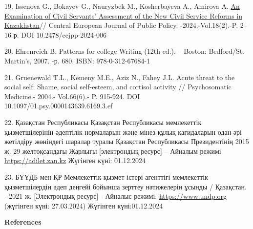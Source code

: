 \begin{references}
19. Issenova G., Bokayev G., Nauryzbek M., Kosherbayeva A., Amirova A.
\href{https://www.scopus.com/record/display.uri?eid=2-s2.0-85208677871&origin=resultslist&sort=plf-f&src=s&sot=b&sdt=b&s=TITLE\%28An+Examination+of+Civil+Servants\%E2\%80\%99+Assessment+of++the+New+Civil+Service+Reforms+in+Kazakhstan\%29&sessionSearchId=9294c12779ee47479a1a0997e8991897&relpos=0}{\hfill\break
An Examination of Civil Servants'{} Assessment of the New
Civil Service Reforms in Kazakhstan}// Central European Journal of
Public Policy. -2024.-Vol.18(2).-P. 2--16 р. DOI 10.2478/cejpp-2024-006

20. Ehrenreich B. Patterns for college Writing (12th ed.). -- Boston:
Bedford/St. Martin's, 2007. -р. 680. ISBN: 978-0-312-67684-1

21. Gruenewald T.L., Kemeny M.E., Aziz N., Fahey J.L. Acute threat to
the social self: Shame, social self-esteem, and cortisol activity //
Psychosomatic Medicine.- 2004.- Vol.66(6).- P. 915-924. DOI\\
10.1097/01.psy.0000143639.6169.3.ef

22. Қазақстан Республикасы Қазақстан Республикасы мемлекеттік
қызметшілерінің әдептілік нормаларын және мінез-құлық қағидаларын одан
әрі жетілдіру жөніндегі шаралар туралы Қазақстан Республикасы
Президентінің 2015 ж. 29 желтоқсандағы Жарлығы {[}электрондық ресурс{]}
-- Айналым режимі \href{https://adilet.zan.kz/kaz/docs/U1500000153}{https://adilet.zan.kz} Жүгінген
күні: 01.12.2024

23. БҰҰДБ мен ҚР Мемлекеттік қызмет істері агенттігі мемлекеттік
қызметшілердің әдеп деңгейі бойынша зерттеу нәтижелерін ұсынды /
Қазақстан. - 2021 ж. {[}Электрондық ресурс{]} - Айналыс режимі:
\href{https://www.undp.org/kk/kazakhstan/press-releases/buudb-men-kr-memlekettik-kyzmet-isteri-agenttigi-memlekettik-kyzmetshilerdin-dep-dengeyi-boyynsha-zertteu-ntizhelerin}{https://www.undp.org}
(жүгінген күні: 27.03.2024) Жүгінген күні:01.12.2024
\end{references}

\begin{center}
{\bfseries References}
\end{center}

